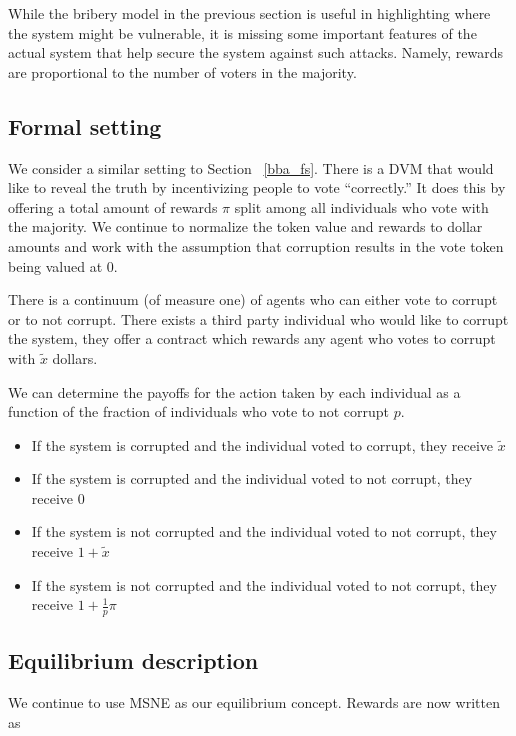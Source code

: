 \documentclass[12pt]{article}
\begin{document}
  While the bribery model in the previous section is useful in highlighting where the system might
  be vulnerable, it is missing some important features of the actual system that help secure the
  system against such attacks. Namely, rewards are proportional to the number of voters in the
  majority.

  \subsection{Formal setting}

    We consider a similar setting to Section ~\ref{bba_fs}. There is a DVM that would like to
    reveal the truth by incentivizing people to vote ``correctly.'' It does this by offering a
    total amount of rewards $\pi$ split among all individuals who vote with the majority. We
    continue to normalize the token value and rewards to dollar amounts and work with the
    assumption that corruption results in the vote token being valued at 0.

    There is a continuum (of measure one) of agents who can either vote to corrupt or to not
    corrupt. There exists a third party individual who would like to corrupt the system, they
    offer a contract which rewards any agent who votes to corrupt with $\tilde{x}$ dollars.

    We can determine the payoffs for the action taken by each individual as a function of the
    fraction of individuals who vote to not corrupt $p$.

    \begin{itemize}
      \item If the system is corrupted and the individual voted to corrupt, they receive
        $\tilde{x}$
      \item If the system is corrupted and the individual voted to not corrupt, they receive $0$
      \item If the system is not corrupted and the individual voted to not corrupt, they receive
        $1 + \tilde{x}$
      \item If the system is not corrupted and the individual voted to not corrupt, they receive
        $1 + \frac{1}{p} \pi$
    \end{itemize}

  \subsection{Equilibrium description}

    We continue to use MSNE as our equilibrium concept. Rewards are now written as
\end{document}
